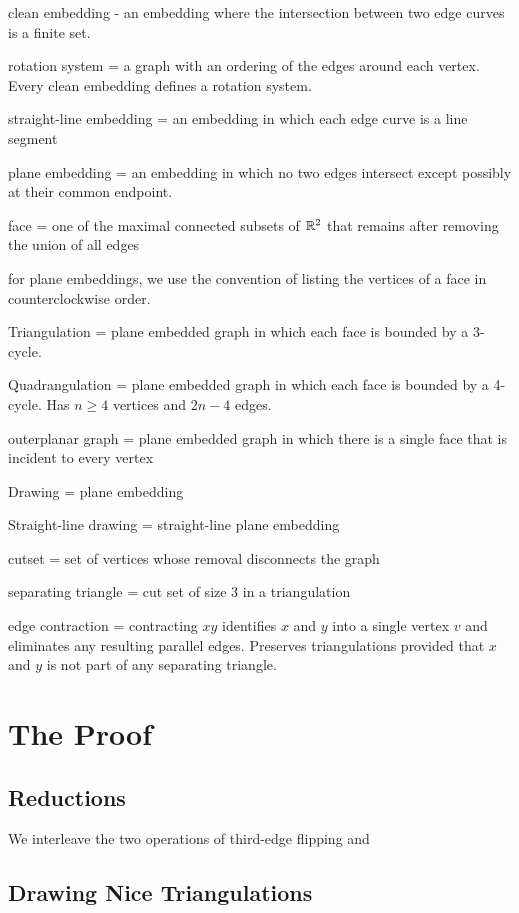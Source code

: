 \documentclass{patmorin}
\begin{document}
clean embedding - an embedding where the intersection between two edge curves is a finite set.  

rotation system = a graph with an ordering of the edges around each vertex. Every clean embedding defines a rotation system.

straight-line embedding = an embedding in which each edge curve is a line segment

plane embedding = an embedding in which no two edges intersect except possibly at their common endpoint.

face = one of the maximal connected subsets of $\mathbb{R}^2$ that remains after removing the union of all edges

for plane embeddings, we use the convention of listing the vertices of a face in counterclockwise order.

Triangulation = plane embedded graph in which each face is bounded by a 3-cycle.

Quadrangulation = plane embedded graph in which each face is bounded by a 4-cycle. Has $n\ge 4$ vertices and $2n-4$ edges.

outerplanar graph = plane embedded graph in which there is a single face that is incident to every vertex

Drawing = plane embedding 

Straight-line drawing = straight-line plane embedding

cutset = set of vertices whose removal disconnects the graph

separating triangle = cut set of size 3 in a triangulation

edge contraction = contracting $xy$ identifies $x$ and $y$ into a single vertex $v$ and eliminates any resulting parallel edges.  Preserves triangulations provided that $x$ and $y$ is not part of any separating triangle.


\section{The Proof}



\subsection{Reductions}


We interleave the two operations of third-edge flipping and 



\subsection{Drawing Nice Triangulations}
\end{document}
